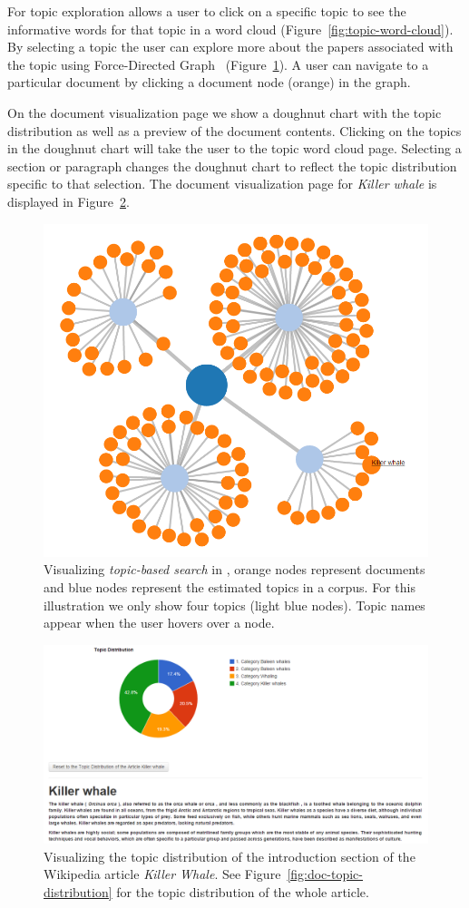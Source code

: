 For topic exploration \system allows a user to click on a specific 
topic to see the informative words for that topic in a word cloud 
(Figure~\ref{fig:topic-word-cloud}). By selecting a topic the user 
can explore more about the papers associated with the topic using 
Force-Directed Graph~\cite{2011-d3} (Figure~\ref{fig:topic-search-viz}).
A user can navigate to a particular document by clicking a document 
node (orange) in the graph. 

On the document visualization page we show a doughnut chart with the topic distribution as well as a preview of the document contents.
Clicking on the topics in the doughnut chart will take the user to the topic word cloud page.
Selecting a section or paragraph changes the doughnut chart to reflect the topic distribution specific to that selection.
The document visualization page for \textit{Killer whale} is displayed in Figure~\ref{fig:doc-para-viz}.





\begin{figure}[htb]\centering 
\includegraphics[width=.5\textwidth]{images/topical_docs.png}
\caption{Visualizing \textsl{topic-based search} in \system, orange 
nodes represent documents and blue nodes represent the estimated 
topics in a corpus. For this illustration we only show four topics 
(light blue nodes). Topic names appear when the user hovers over a 
node.}
\label{fig:topic-search-viz}
\end{figure}

\begin{figure}[htb]\centering 
\includegraphics[width=1\textwidth]{images/para_topic_distribution.png}
\caption{Visualizing the topic distribution of the introduction 
section of the Wikipedia article \textit{Killer Whale}. See Figure~\ref{fig:doc-topic-distribution} for the topic distribution of 
the whole article.}
\label{fig:doc-para-viz}
\end{figure}

